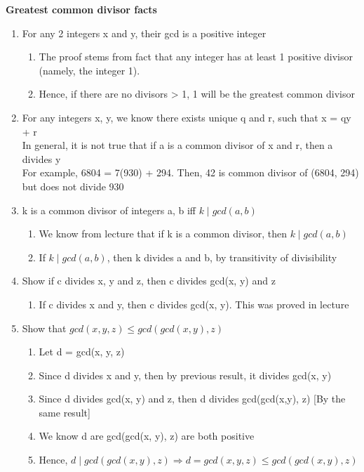 \documentclass{article}
\begin{document}
\textbf{Greatest common divisor facts}

\begin{enumerate}
\item For any 2 integers x and y, their gcd is a positive integer
\begin{enumerate}
\item The proof stems from fact that any integer has at least 1 positive divisor (namely, the integer 1).
\item Hence, if there are no divisors > 1, 1 will be the greatest common divisor
\end{enumerate}

\item For any integers x, y, we know there exists unique q and r, such that x = qy + r
\\ In general, it is not true that if a is a common divisor of x and r, then a divides y
\\ For example, 6804 = 7(930) + 294. Then, 42 is common divisor of (6804, 294) but does not divide 930

\item k is a common divisor of integers a, b iff $ k \mid gcd(a, b) $
\begin{enumerate}
\item We know from lecture that if k is a common divisor, then $ k \mid gcd(a,b) $
\item If $ k \mid gcd(a, b) $, then k divides a and b, by transitivity of divisibility
\end{enumerate}


\item Show if c divides x, y and z, then c divides gcd(x, y) and z
\begin{enumerate}
\item If c divides x and y, then c divides gcd(x, y). This was proved in lecture
\end{enumerate}

\item Show that $ gcd(x, y, z) \leq gcd(gcd(x,y), z) $
\begin{enumerate}
\item Let d = gcd(x, y, z)
\item Since d divides x and y, then by previous result, it divides gcd(x, y)
\item Since d divides gcd(x, y) and z, then d divides gcd(gcd(x,y), z) [By the same result]
\item We know d are gcd(gcd(x, y), z) are both positive
\item Hence, $ d \mid gcd(gcd(x,y), z) \Rightarrow d = gcd(x, y, z) \leq gcd(gcd(x,y), z) $
\end{enumerate}


\end{enumerate}
\end{document}
